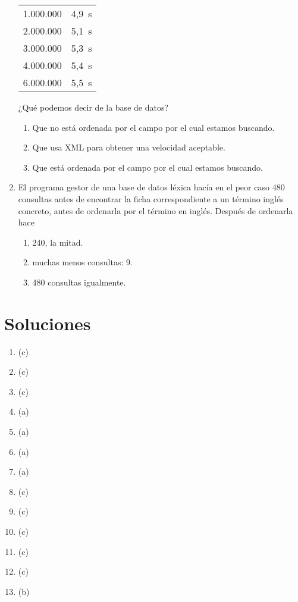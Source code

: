 \begin{enumerate}
\begin{center}
\begin{tabular}{c|c}
1.000.000 &4,9~s \\ 2.000.000 &5,1~s \\ 3.000.000 &5,3~s \\ 4.000.000 &5,4~s \\ 6.000.000 &5,5~s \\ \hline

\end{tabular} \end{center} ¿Qué podemos decir de la base de datos? \begin{enumerate} \item Que no está ordenada por el campo por el cual estamos buscando. \item Que usa XML para obtener una velocidad aceptable. \item Que está ordenada por el campo por el cual estamos buscando. \end{enumerate} 

\item El programa gestor de una base de datos léxica hacía en el peor caso 480 consultas antes de encontrar la ficha correspondiente a un término inglés concreto, antes de ordenarla por el término en inglés. Después de ordenarla hace \begin{enumerate} \item 240, la mitad. \item muchas menos consultas: 9. \item 480 consultas igualmente. \end{enumerate} \end{enumerate} 

\section{Soluciones}  \begin{enumerate} \item (c) \item (c) \item (c) \item (a) \item (a) 

\item (a) \item (a) \item (c) \item (c) \item (c) 

\item (c) \item (c) \item (b) \end{enumerate} 